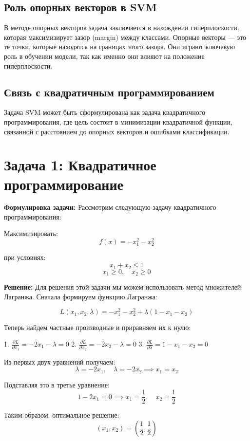 \subsection{Роль опорных векторов в SVM}

В методе опорных векторов задача заключается в нахождении гиперплоскости, которая максимизирует зазор (margin) между классами. Опорные векторы — это те точки, которые находятся на границах этого зазора. Они играют ключевую роль в обучении модели, так как именно они влияют на положение гиперплоскости.

\subsection{Связь с квадратичным программированием}

Задача SVM может быть сформулирована как задача квадратичного программирования, где цель состоит в минимизации квадратичной функции, связанной с расстоянием до опорных векторов и ошибками классификации.

\section{Задача 1: Квадратичное программирование}

\textbf{Формулировка задачи:} Рассмотрим следующую задачу квадратичного программирования:

Максимизировать:
\[
    f(x) = -x_1^2 - x_2^2
\]

при условиях:
\[
    x_1 + x_2 \leq 1
\]
\[
    x_1 \geq 0, \quad x_2 \geq 0
\]

\textbf{Решение:} Для решения этой задачи мы можем использовать метод множителей Лагранжа. Сначала формируем функцию Лагранжа:

\[
    L(x_1, x_2, \lambda) = -x_1^2 - x_2^2 + \lambda(1 - x_1 - x_2)
\]

Теперь найдем частные производные и приравняем их к нулю:

1. \(\frac{\partial L}{\partial x_1} = -2x_1 - \lambda = 0\)
2. \(\frac{\partial L}{\partial x_2} = -2x_2 - \lambda = 0\)
3. \(\frac{\partial L}{\partial \lambda} = 1 - x_1 - x_2 = 0\)

Из первых двух уравнений получаем:
\[
    \lambda = -2x_1, \quad \lambda = -2x_2 \implies x_1 = x_2
\]

Подставляя это в третье уравнение:
\[
    1 - 2x_1 = 0 \implies x_1 = \frac{1}{2}, \quad x_2 = \frac{1}{2}
\]

Таким образом, оптимальное решение:
\[
    (x_1, x_2) = \left(\frac{1}{2}, \frac{1}{2}\right)
\]

